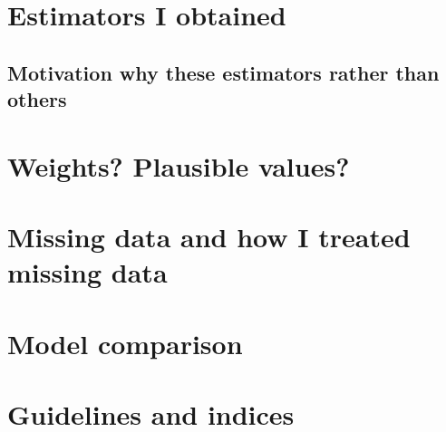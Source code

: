 \documentclass[a4paper,11pt,UKenglish,twoside,openright]{report}\usepackage[]{graphicx}\usepackage[]{color}
\begin{document}
\section{Estimators I obtained}

\subsection{Motivation why these estimators rather than others}

\section{Weights? Plausible values?}

\section{Missing data and how I treated missing data}

\section{Model comparison}

\section{Guidelines and indices}




\newpage
\begin{singlespace}
    \printbibliography[title=References]
\end{singlespace}





\begin{appendices}
%    
%    
%    
%    
%    
%    
\end{appendices}

\cleardoublepage
{}
{}
\printindex[a]

\cleardoublepage
{}
{}
\printindex
\end{document}
